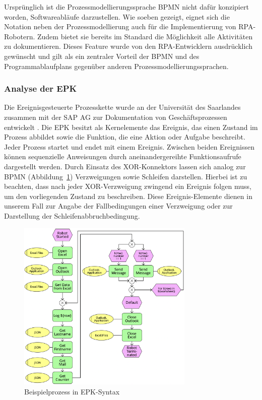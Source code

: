 Ursprünglich ist die Prozessmodellierungssprache BPMN nicht dafür konzipiert worden, Softwareabläufe darzustellen. Wie soeben gezeigt, eignet sich die Notation neben der Prozessmodellierung auch für die Implementierung von RPA-Robotern. Zudem bietet sie bereits im Standard die Möglichkeit alle Aktivitäten zu dokumentieren. Dieses Feature wurde von den RPA-Entwicklern ausdrücklich gewünscht und gilt als ein zentraler Vorteil der BPMN und des Programmablaufplans gegenüber anderen Prozessmodellierungssprachen.

\subsubsection{Analyse der EPK}

Die Ereignisgesteuerte Prozesskette wurde an der Universität des Saarlandes zusammen mit der SAP AG zur Dokumentation von Geschäftsprozessen entwickelt \cite{epkSyntax}.
Die EPK besitzt als Kernelemente das Ereignis, das einen Zustand im Prozess abbildet sowie die Funktion, die eine Aktion oder Aufgabe beschreibt. Jeder Prozess startet und endet mit einem Ereignis. Zwischen beiden Ereignissen können sequenzielle Anweisungen durch aneinandergereihte Funktionsaufrufe dargestellt werden. Durch Einsatz des XOR-Konnektors lassen sich analog zur BPMN (\mbox{Abbildung \ref{fig:ScrEPK}}) Verzweigungen sowie Schleifen darstellen.  Hierbei ist zu beachten, dass nach jeder XOR-Verzweigung zwingend ein Ereignis folgen muss, um den vorliegenden Zustand zu beschreiben. Diese Ereignis-Elemente dienen in unserem Fall zur Angabe der Fallbedingungen einer Verzweigung oder zur Darstellung der Schleifenabbruchbedingung.

\begin{figure}[h!]
    \centering
    \includegraphics[width=0.75\textwidth]{Bachelorarbeit/images/ScreenshotEPK3.png}
    \caption{Beispielprozess in EPK-Syntax}
    \label{fig:ScrEPK}
\end{figure}

